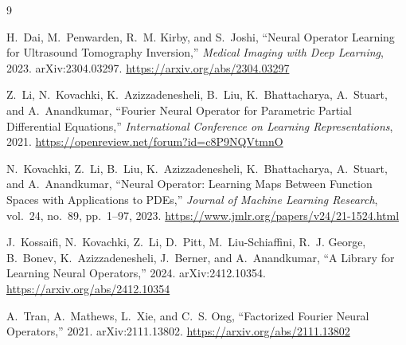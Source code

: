 \documentclass[11pt]{article}
\begin{document}
\begin{thebibliography}{9}

H.~Dai, M.~Penwarden, R.~M. Kirby, and S.~Joshi,
``Neural Operator Learning for Ultrasound Tomography Inversion,''
\emph{Medical Imaging with Deep Learning}, 2023.
arXiv:2304.03297.
\url{https://arxiv.org/abs/2304.03297}

Z.~Li, N.~Kovachki, K.~Azizzadenesheli, B.~Liu, K.~Bhattacharya,
A.~Stuart, and A.~Anandkumar,
``Fourier Neural Operator for Parametric Partial Differential Equations,''
\emph{International Conference on Learning Representations}, 2021.
\url{https://openreview.net/forum?id=c8P9NQVtmnO}

N.~Kovachki, Z.~Li, B.~Liu, K.~Azizzadenesheli, K.~Bhattacharya,
A.~Stuart, and A.~Anandkumar,
``Neural Operator: Learning Maps Between Function Spaces with Applications
to PDEs,'' \emph{Journal of Machine Learning Research}, vol.~24, no.~89,
pp.~1--97, 2023.
\url{https://www.jmlr.org/papers/v24/21-1524.html}

J.~Kossaifi, N.~Kovachki, Z.~Li, D.~Pitt, M.~Liu-Schiaffini,
R.~J. George, B.~Bonev, K.~Azizzadenesheli, J.~Berner, and A.~Anandkumar,
``A Library for Learning Neural Operators,'' 2024.
arXiv:2412.10354.
\url{https://arxiv.org/abs/2412.10354}

A.~Tran, A.~Mathews, L.~Xie, and C.~S. Ong,
``Factorized Fourier Neural Operators,'' 2021.
arXiv:2111.13802.
\url{https://arxiv.org/abs/2111.13802}

\end{thebibliography}
\end{document}
